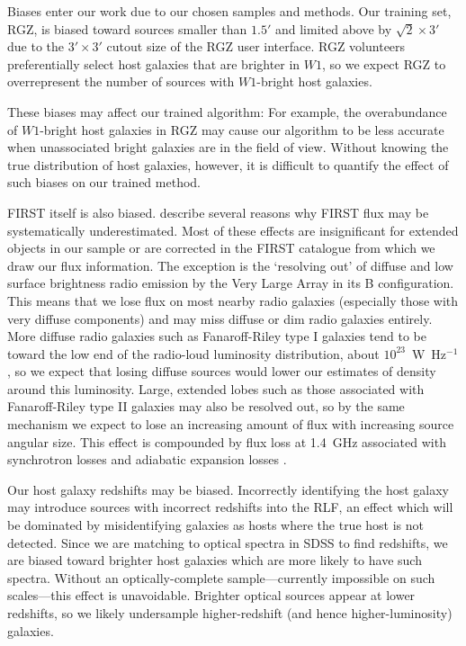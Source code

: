     Biases enter our work due to our chosen samples and methods. Our training set,
    RGZ, is biased toward sources smaller than $1.5'$ and limited above by $\sqrt{2}
    \times 3'$ due to the $3' \times 3'$ cutout size of the RGZ user
    interface. RGZ volunteers preferentially select host
    galaxies that are brighter in $W1$, so we expect RGZ to overrepresent
    the number of sources with $W1$-bright host galaxies.

    These biases may affect our
    trained algorithm: For example, the overabundance of $W1$-bright host
    galaxies in RGZ may cause our algorithm to be less accurate when
    unassociated bright galaxies are in the field of view. Without knowing the true
    distribution of host galaxies, however, it is difficult to quantify the
    effect of such biases on our trained method.

    FIRST itself is also biased. \citet{helfand15first} describe several reasons why FIRST flux may be systematically underestimated. Most of these effects are insignificant for extended objects in our sample or are corrected in the FIRST catalogue from which we draw our flux information. The exception is the `resolving out' of diffuse and low surface brightness radio emission by the Very Large Array in its B configuration. This means that we lose flux on most nearby radio galaxies (especially those with very
    diffuse components) and may miss diffuse or dim radio galaxies entirely.
    More diffuse radio galaxies such as Fanaroff-Riley type I \citep[FRI;][]{fanaroff1974} galaxies tend to
    be toward the low end of the radio-loud luminosity distribution, about
    $10^{23}$~W~Hz$^{-1}$ \citep{best09radio}, so we expect that losing
    diffuse sources would lower our estimates of density around this
    luminosity. Large, extended lobes such as those associated with Fanaroff-Riley type II \citep[FRII;][]{fanaroff1974} galaxies may also be resolved out, so by the same mechanism we expect to lose an increasing amount of flux with increasing source angular size. This effect is compounded by flux loss at 1.4~GHz associated with synchrotron losses and adiabatic expansion losses \citep{blundell99doubles}.

    Our host galaxy redshifts may be biased. Incorrectly identifying the host galaxy may introduce sources with incorrect redshifts into the RLF, an effect which will be dominated by misidentifying galaxies as hosts where the true host is not detected. Since we are matching to optical spectra in SDSS to find
    redshifts, we are biased toward brighter host galaxies which are more
    likely to have such spectra. Without an optically-complete sample---currently impossible on such scales---this effect is unavoidable.
    Brighter optical sources appear at lower redshifts, so we likely
    undersample higher-redshift (and hence higher-luminosity) galaxies.

